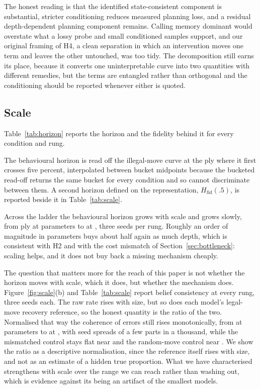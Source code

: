 \documentclass[manuscript, screen, review]{jair}
\theoremstyle{remark}
\begin{document}
The honest reading is that the identified state-consistent component is
substantial, stricter conditioning reduces measured planning loss, and a residual
depth-dependent planning component remains. Calling memory dominant would
overstate what a lossy probe and small conditioned samples support, and our
original framing of H4, a clean separation in which an intervention moves one
term and leaves the other untouched, was too tidy. The decomposition still earns
its place, because it converts one uninterpretable curve into two quantities with
different remedies, but the terms are entangled rather than orthogonal and the
conditioning should be reported whenever either is quoted.

\subsection{Scale}
\label{sec:scale}

Table~\ref{tab:horizon} reports the horizon and the fidelity behind it for every
condition and rung.




The behavioural horizon is read off the illegal-move curve at the ply where it
first crosses five percent, interpolated between bucket midpoints because the
bucketed read-off returns the same bucket for every condition and so cannot
discriminate between them. A second horizon defined on the representation,
$H_{\mathrm{fid}}(.5)$, is reported beside it in Table~\ref{tab:scale}.

Across the ladder the behavioural horizon grows with scale and grows slowly,
from  ply at  parameters to
 at , three seeds per rung. Roughly an
order of magnitude in parameters buys about half again as much depth, which
is consistent with H2 and with the cost mismatch of Section~\ref{sec:bottleneck}:
scaling helps, and it does not buy back a missing mechanism cheaply.

The question that matters more for the reach of this paper is not whether the
horizon moves with scale, which it does, but whether the mechanism does.
Figure~\ref{fig:scale}(b) and Table~\ref{tab:scale} report belief consistency at
every rung, three seeds each. The raw rate rises with size, but so does each
model's legal-move recovery reference, so the honest quantity is the ratio of the two.
Normalised that way the coherence of errors still rises monotonically, from
 at  parameters to
 at , with seed spreads of a few parts
in a thousand, while the mismatched control stays flat near
 and the random-move control near . We show
the ratio as a descriptive normalisation, since the reference itself rises with
size, and not as an estimate of a hidden true proportion. What we have characterised strengthens with scale over
the range we can reach rather than washing out, which is evidence against its
being an artifact of the smallest models.
\end{document}
